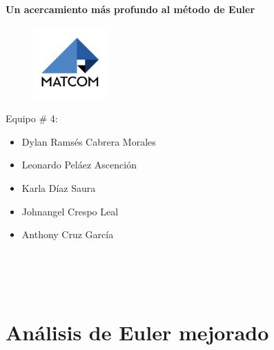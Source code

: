 \documentclass[12pt,a4paper]{article}
\begin{document}
    \begin{titlepage}
        \begin{center}
            \Huge
			\textbf{}
			\vspace{1cm}
			\textbf{Un acercamiento más profundo al método de Euler}
            \vspace{1cm}
            \begin{figure}[h]
                \centering
				\includegraphics[width=0.25\textwidth]{Logo MatCom.jpg}
				\label{fig:imagen}
            \end{figure}
            \Large
            \vspace{1cm}
            \newline
            \begin{center}
             Equipo \# 4:   
            \end{center}
            \begin{center}
                \begin{itemize}
                \item Dylan Ramsés Cabrera Morales
                \item Leonardo Peláez Ascención
                \item Karla Díaz Saura
                \item Johnangel Crespo Leal
                \item Anthony Cruz García
            \end{itemize}
            \end{center}
            \vspace{1cm}
            \\
            \vspace{0.5cm}
            \\
            \vspace{0.5cm}
            \\
        \end{center}
    \end{titlepage}
    \newpage
    \tableofcontents
    \newpage
    \section{Análisis de Euler mejorado}
\end{document}
